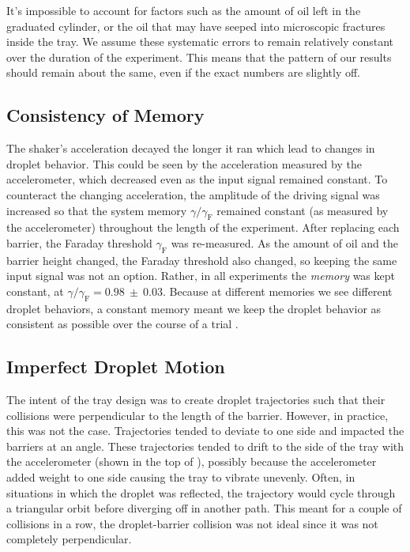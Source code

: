 It's impossible to account for factors such as the amount of oil left in the graduated cylinder, or the oil that may have seeped into microscopic fractures inside the tray. We assume these systematic errors to remain relatively constant over the duration of the experiment. This means that the pattern of our results should remain about the same, even if the exact numbers are slightly off. 

    \subsection{Consistency of Memory}
The shaker's acceleration decayed the longer it ran which lead to changes in droplet behavior. This could be seen by the acceleration measured by the accelerometer, which decreased even as the input signal remained constant. To counteract the changing acceleration, the amplitude of the driving signal was increased so that the system memory $\gamma/\gamma_\mathrm{F}$ remained constant (as measured by the accelerometer) throughout the length of the experiment. After replacing each barrier, the Faraday threshold $\gamma_\mathrm{F}$ was re-measured. As the amount of oil and the barrier height changed, the Faraday threshold also changed, so keeping the same input signal was not an option. Rather, in all experiments the \textit{memory} was kept constant, at $\gamma/\gamma_\mathrm{F} = \mathbf{0.98~\pm~0.03}$. Because at different memories we see different droplet behaviors, a constant memory meant we keep the droplet behavior as consistent as possible over the course of a trial . 

    \subsection{Imperfect Droplet Motion}
The intent of the tray design was to create droplet trajectories such that their collisions were perpendicular to the length of the barrier. However, in practice, this was not the case. Trajectories tended to deviate to one side and impacted the barriers at an angle. These trajectories tended to drift to the side of the tray with the accelerometer (shown in the top of ), possibly because the accelerometer added weight to one side causing the tray to vibrate unevenly. Often, in situations in which the droplet was reflected, the trajectory would cycle through a triangular orbit before diverging off in another path. This meant for a couple of collisions in a row, the droplet-barrier collision was not ideal since it was not completely perpendicular.

